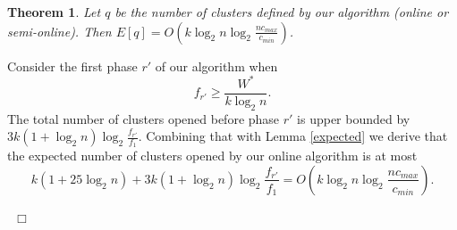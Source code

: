 \documentclass[11pt,twoside]{article}
\newtheorem{theorem}{Theorem}
\newenvironment{proof}{\medskip\noindent {\bf Proof.}}{~\hfill$\Box$\medskip}
\begin{document}
\begin{theorem}
Let $q$ be the number of clusters defined by our algorithm (online or semi-online). Then $E[q]=O\left(k \log_2 n \log_2 \frac{n c_{max}}{c_{min}}\right)$.
\end{theorem}
\begin{proof}
Consider the first phase $r'$ of our algorithm when $$f_{r'}\ge \frac{W^*}{k\log_2 n}.$$
The total number of clusters opened before phase $r'$ is upper bounded by $3k (1+\log_2 n)\log_2\frac{ f_{r'}}{f_1}$.
Combining that with Lemma \ref{expected} we derive that the expected number of clusters opened by our online algorithm is at most 
$$k(1+25\log_2 n) +3k(1+\log_2 n) \log_2\frac{ f_{r'}}{f_1}=O\left(k\log_2 n \log_2 \frac{n c_{max}}{c_{min}}\right).$$

\end{proof}
\end{document}
